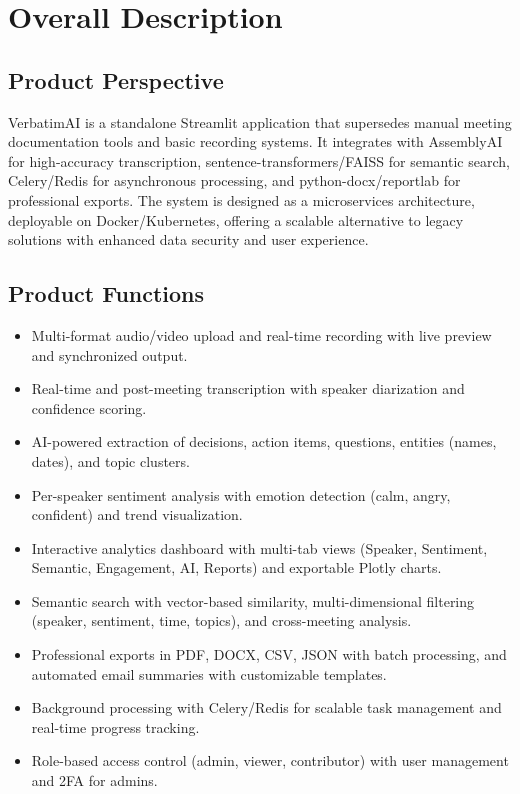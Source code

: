 \documentclass[12pt]{article}
\begin{document}
\section{Overall Description}
\subsection{Product Perspective}
VerbatimAI is a standalone Streamlit application that supersedes manual meeting documentation tools and basic recording systems. It integrates with AssemblyAI for high-accuracy transcription, sentence-transformers/FAISS for semantic search, Celery/Redis for asynchronous processing, and python-docx/reportlab for professional exports. The system is designed as a microservices architecture, deployable on Docker/Kubernetes, offering a scalable alternative to legacy solutions with enhanced data security and user experience.

\subsection{Product Functions}
\begin{itemize}
    \item Multi-format audio/video upload and real-time recording with live preview and synchronized output.
    \item Real-time and post-meeting transcription with speaker diarization and confidence scoring.
    \item AI-powered extraction of decisions, action items, questions, entities (names, dates), and topic clusters.
    \item Per-speaker sentiment analysis with emotion detection (calm, angry, confident) and trend visualization.
    \item Interactive analytics dashboard with multi-tab views (Speaker, Sentiment, Semantic, Engagement, AI, Reports) and exportable Plotly charts.
    \item Semantic search with vector-based similarity, multi-dimensional filtering (speaker, sentiment, time, topics), and cross-meeting analysis.
    \item Professional exports in PDF, DOCX, CSV, JSON with batch processing, and automated email summaries with customizable templates.
    \item Background processing with Celery/Redis for scalable task management and real-time progress tracking.
    \item Role-based access control (admin, viewer, contributor) with user management and 2FA for admins.
\end{itemize}
\end{document}
